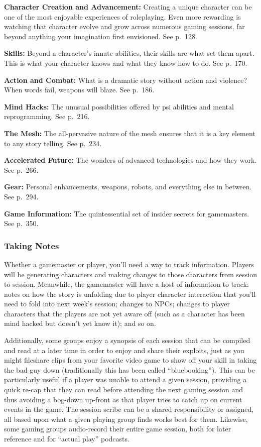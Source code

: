 \textbf{Character Creation and Advancement:} Creating a 
unique character can be one of the most enjoyable 
experiences of roleplaying. Even more rewarding is 
watching that character evolve and grow across numerous
gaming sessions, far beyond anything your
imagination first envisioned. See p. 128.

\textbf{Skills:} Beyond a character's innate abilities, their 
skills are what set them apart. This is what your 
character knows and what they know how to do. See 
p. 170.

\textbf{Action and Combat:} What is a dramatic story without
action and violence? When words fail, weapons
will blaze. See p. 186.

\textbf{Mind Hacks: }The unusual possibilities offered by 
psi abilities and mental reprogramming. See p. 216.

\textbf{The Mesh: }The all-pervasive nature of the mesh 
ensures that it is a key element to any story telling. 
See p. 234.

\textbf{Accelerated Future:} The wonders of advanced technologies
and how they work. See p. 266.

\textbf{Gear:} Personal enhancements, weapons, robots, and 
everything else in between. See p. 294.

\textbf{Game Information:} The quintessential set of insider 
secrets for gamemasters. See p. 350.

\subsubsection{Taking Notes}

Whether a gamemaster or player, you'll need a way to 
track information. Players will be generating characters
and making changes to those characters from session
to session. Meanwhile, the gamemaster will have
a host of information to track: notes on how the story 
is unfolding due to player character interaction that 
you'll need to fold into next week's session; changes 
to NPCs; changes to player characters that the players 
are not yet aware off (such as a character has been 
mind hacked but doesn't yet know it); and so on.

Additionally, some groups enjoy a synopsis of 
each session that can be compiled and read at a 
later time in order to enjoy and share their exploits, 
just as you might fileshare clips from your favorite 
video game to show off your skill in taking the 
bad guy down (traditionally this has been called 
``bluebooking''). This can be particularly useful if a 
player was unable to attend a given session, providing
a quick re-cap that they can read before attending
the next gaming session and thus avoiding
a bog-down up-front as that player tries to catch 
up on current events in the game. The session scribe 
can be a shared responsibility or assigned, all based 
upon what a given playing group finds works best 
for them. Likewise, some gaming groups audio-record
their entire game session, both for later
reference and for ``actual play'' podcasts.

